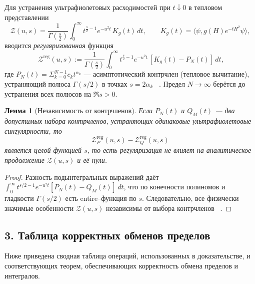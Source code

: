 \documentclass{article}
\numberwithin{equation}{section}
\theoremstyle{plain}
\newtheorem{lemma}{Лемма}
\theoremstyle{definition}
\theoremstyle{remark}
\def\alpha{α}\def\beta{β}\def\gamma{γ}\def\Gamma{Γ}%
\def\infty{∞}\def\partial{∂}\def\sum{Σ}\def\int{∫}%
\begin{document}
Для устранения ультрафиолетовых расходимостей при $t\downarrow0$ в тепловом представлении
\begin{equation}
\mathcal Z(u,s)=\frac{1}{\Gamma(\frac s2)}\int_0^\infty t^{\frac s2-1} e^{-u^2 t}\,K_g(t)\,dt,\qquad K_g(t)=\langle \psi, g(H)e^{-tH^2}\psi\rangle,
\end{equation}
вводится \emph{регуляризованная} функция
\begin{equation}
\boxed{\
\mathcal Z^{\mathrm{reg}}(u,s)
:=\frac{1}{\Gamma(\frac s2)}
\int_0^\infty t^{\frac s2-1} e^{-u^2 t}\,[K_g(t)-P_N(t)]\,dt,
}
\end{equation}
где $P_N(t)=\sum_{k=0}^{N-1} c_k t^{\alpha_k}$ — асимптотический контрчлен (тепловое вычитание), устраняющий полюса $\Gamma(s/2)$ в точках $s=2\alpha_k$ ~\cite{Gilkey1995}.
Предел $N\to\infty$ берётся до устранения всех полюсов на $\Re s>0$.

\begin{lemma}[Независимость от контрчленов]
Если $P_N(t)$ и $Q_M(t)$ — два допустимых набора контрчленов, устраняющих одинаковые ультрафиолетовые сингулярности, то
\begin{equation}
\mathcal Z^{\mathrm{reg}}_P(u,s)-\mathcal Z^{\mathrm{reg}}_Q(u,s)
\end{equation}
является целой функцией $s$, то есть регуляризация не влияет на аналитическое продолжение $\mathcal Z(u,s)$ и её нули.
\end{lemma}

\begin{proof}
Разность подынтегральных выражений даёт $\int_0^\infty t^{s/2-1} e^{-u^2 t}[P_N(t)-Q_M(t)]\,dt$, 
что по конечности полиномов и гладкости $\Gamma(s/2)$ есть entire–функция по $s$.  
Следовательно, все физически значимые особенности $\mathcal Z(u,s)$ независимы от выбора контрчленов ~\cite{Vassilevich2003}.
\end{proof}

\subsection*{3. Таблица корректных обменов пределов}
\label{sec:limits}
Ниже приведена сводная таблица операций, использованных в доказательстве, и соответствующих теорем, обеспечивающих корректность обмена пределов и интегралов.
\end{document}
